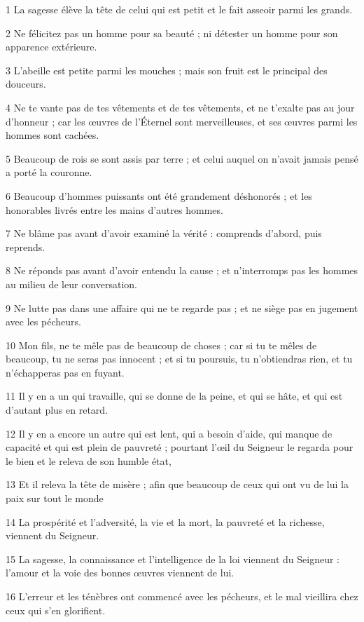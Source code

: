 \par 1 La sagesse élève la tête de celui qui est petit et le fait asseoir parmi les grands.
\par 2 Ne félicitez pas un homme pour sa beauté ; ni détester un homme pour son apparence extérieure.
\par 3 L'abeille est petite parmi les mouches ; mais son fruit est le principal des douceurs.
\par 4 Ne te vante pas de tes vêtements et de tes vêtements, et ne t'exalte pas au jour d'honneur ; car les œuvres de l'Éternel sont merveilleuses, et ses œuvres parmi les hommes sont cachées.
\par 5 Beaucoup de rois se sont assis par terre ; et celui auquel on n'avait jamais pensé a porté la couronne.
\par 6 Beaucoup d'hommes puissants ont été grandement déshonorés ; et les honorables livrés entre les mains d'autres hommes.
\par 7 Ne blâme pas avant d'avoir examiné la vérité : comprends d'abord, puis reprends.
\par 8 Ne réponds pas avant d'avoir entendu la cause ; et n'interromps pas les hommes au milieu de leur conversation.
\par 9 Ne lutte pas dans une affaire qui ne te regarde pas ; et ne siège pas en jugement avec les pécheurs.
\par 10 Mon fils, ne te mêle pas de beaucoup de choses ; car si tu te mêles de beaucoup, tu ne seras pas innocent ; et si tu poursuis, tu n'obtiendras rien, et tu n'échapperas pas en fuyant.
\par 11 Il y en a un qui travaille, qui se donne de la peine, et qui se hâte, et qui est d'autant plus en retard.
\par 12 Il y en a encore un autre qui est lent, qui a besoin d'aide, qui manque de capacité et qui est plein de pauvreté ; pourtant l'œil du Seigneur le regarda pour le bien et le releva de son humble état,
\par 13 Et il releva la tête de misère ; afin que beaucoup de ceux qui ont vu de lui la paix sur tout le monde
\par 14 La prospérité et l'adversité, la vie et la mort, la pauvreté et la richesse, viennent du Seigneur.
\par 15 La sagesse, la connaissance et l'intelligence de la loi viennent du Seigneur : l'amour et la voie des bonnes œuvres viennent de lui.
\par 16 L'erreur et les ténèbres ont commencé avec les pécheurs, et le mal vieillira chez ceux qui s'en glorifient.

